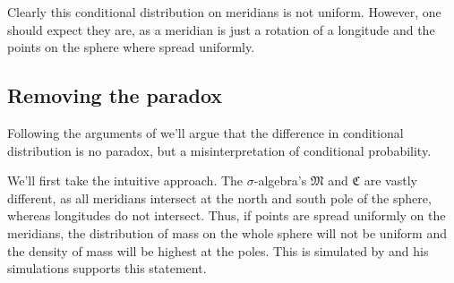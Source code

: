 \documentclass[twoside,a4paper]{article}
\theoremstyle{plain}
\theoremstyle{definition}
\theoremstyle{remark}
\numberwithin{equation}{section}
\DeclareMathOperator{\1}{\mathbbm{1}}
\begin{document}
Clearly this conditional distribution on meridians is not uniform. However, one should expect they are, as a meridian is just a rotation of a longitude and the points on the sphere where spread uniformly.
\subsection{Removing the paradox}
Following the arguments of \cite{Gyenis17} we'll argue that the difference in conditional distribution is no paradox, but a misinterpretation of conditional probability.

We'll first take the intuitive approach. The $\sigma$-algebra's $\mathfrak{M}$ and $\mathfrak{C}$ are vastly different, as all meridians intersect at the north and south pole of the sphere, whereas longitudes do not intersect. Thus, if points are spread uniformly on the meridians, the distribution of mass on the whole sphere will not be uniform and the density of mass will be highest at the poles. This is simulated by \cite{Weisstein} and his simulations supports this statement.
\end{document}
